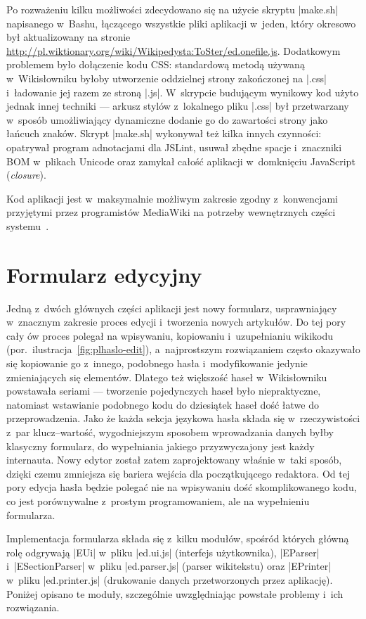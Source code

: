 Po rozważeniu kilku możliwości zdecydowano się na użycie skryptu \kod|make.sh| napisanego w~Bashu, łączącego wszystkie pliki aplikacji w~jeden, który okresowo był aktualizowany na stronie \url{http://pl.wiktionary.org/wiki/Wikipedysta:ToSter/ed.onefile.js}. Dodatkowym problemem było dołączenie kodu CSS: standardową metodą używaną w~Wikisłowniku byłoby utworzenie oddzielnej strony zakończonej na \kod|.css| i~ładowanie jej razem ze stroną \kod|.js|. W~skrypcie budującym wynikowy kod użyto jednak innej techniki --- arkusz stylów z~lokalnego pliku \kod|.css| był przetwarzany w~sposób umożliwiający dynamiczne dodanie go do zawartości strony jako łańcuch znaków. Skrypt \kod|make.sh| wykonywał też kilka innych czynności: opatrywał program adnotacjami dla JSLint, usuwał zbędne spacje i~znaczniki BOM w~plikach Unicode oraz zamykał całość aplikacji w~domknięciu JavaScript (\emph{closure}).

Kod aplikacji jest w~maksymalnie możliwym zakresie zgodny z~konwencjami przyjętymi przez programistów MediaWiki na potrzeby wewnętrznych części systemu~\cite{mw:conventions}.

\section{Formularz edycyjny}
\label{sec:impl-form}

Jedną z~dwóch głównych części aplikacji jest nowy formularz, usprawniający w~znacznym zakresie proces edycji i~tworzenia nowych artykułów. Do tej pory cały ów proces polegał na wpisywaniu, kopiowaniu i~uzupełnianiu wikikodu (por.~ilustracja~\ref{fig:plhaslo-edit}), a~najprostszym rozwiązaniem często okazywało się kopiowanie go z~innego, podobnego hasła i~modyfikowanie jedynie zmieniających się elementów. Dlatego też większość haseł w~Wikisłowniku powstawała seriami --- tworzenie pojedynczych haseł było niepraktyczne, natomiast wstawianie podobnego kodu do dziesiątek haseł dość łatwe do przeprowadzenia. Jako że każda sekcja językowa hasła składa się w~rzeczywistości z~par klucz--wartość, wygodniejszym sposobem wprowadzania danych byłby klasyczny formularz, do wypełniania jakiego przyzwyczajony jest każdy internauta. Nowy edytor został zatem zaprojektowany właśnie w~taki sposób, dzięki czemu zmniejsza się bariera wejścia dla początkującego redaktora. Od tej pory edycja hasła będzie polegać nie na wpisywaniu dość skomplikowanego kodu, co jest porównywalne z~prostym programowaniem, ale na wypełnieniu formularza.

Implementacja formularza składa się z~kilku modułów, spośród których główną rolę odgrywają \kod|EUi| w~pliku \kod|ed.ui.js| (interfejs użytkownika), \kod|EParser| i~\kod|ESectionParser| w~pliku \kod|ed.parser.js| (parser wikitekstu) oraz \kod|EPrinter| w~pliku \kod|ed.printer.js| (drukowanie danych przetworzonych przez aplikację). Poniżej opisano te moduły, szczególnie uwzględniając powstałe problemy i~ich rozwiązania.

